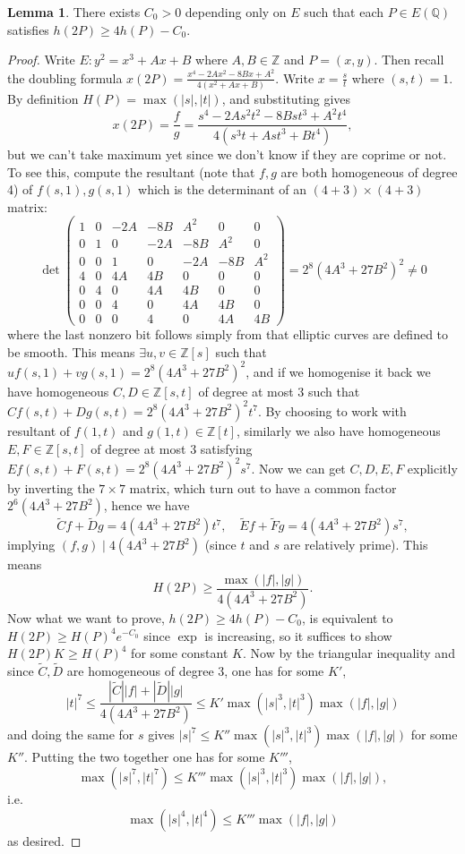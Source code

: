 \documentclass{article}
\newcommand{\Z}{\mathbb{Z}}
\newcommand{\Q}{\mathbb{Q}}
\theoremstyle{definition}
\newtheorem{lemma}[defn]{Lemma}
\begin{document}
\begin{lemma}
There exists $C_0>0$ depending only on $E$ such that each $P\in E(\Q)$ satisfies $h(2P)\geq 4h(P)-C_0$.
\end{lemma}
\begin{proof}
Write $E:y^2=x^3+Ax+B$ where $A,B\in\Z$ and $P=(x,y)$. Then recall the doubling formula $x(2P)=\frac{x^4-2Ax^2-8Bx+A^2}{4(x^2+Ax+B)}$. Write $x=\frac{s}{t}$ where $(s,t)=1$. By definition $H(P)=\max(|s|,|t|)$, and substituting gives
\[
x(2P)=\frac{f}{g}=\frac{s^4-2As^2t^2-8Bst^3+A^2t^4}{4(s^3t+Ast^3+Bt^4)},
\]
but we can't take maximum yet since we don't know if they are coprime or not. To see this, compute the resultant (note that $f,g$ are both homogeneous of degree 4) of $f(s,1),g(s,1)$ which is the determinant of an $(4+3)\times (4+3)$ matrix:
\[
\det\begin{pmatrix}
1 & 0 & -2A & -8B & A^2 & 0 & 0 \\
0 & 1 & 0 & -2A & -8B & A^2 & 0 \\
0 & 0 & 1 & 0 & -2A & -8B & A^2 \\
4 & 0 & 4A & 4B & 0 & 0 & 0 \\
0 & 4 & 0 & 4A & 4B & 0 & 0 \\
0 & 0 & 4 & 0 & 4A & 4B & 0 \\
0 & 0 & 0 & 4 & 0 & 4A & 4B
\end{pmatrix}=2^8(4A^3+27B^2)^2\neq 0
\]
where the last nonzero bit follows simply from that elliptic curves are defined to be smooth. This means $\exists u,v\in\Z[s]$ such that $uf(s,1)+vg(s,1)=2^8(4A^3+27B^2)^2$, and if we homogenise it back we have homogeneous $C,D\in\Z[s,t]$ of degree at most 3 such that $Cf(s,t)+Dg(s,t)=2^8(4A^3+27B^2)^2t^7$. By choosing to work with resultant of $f(1,t)$ and $g(1,t)\in\Z[t]$, similarly we also have homogeneous $E,F\in\Z[s,t]$ of degree at most 3 satisfying $Ef(s,t)+F(s,t)=2^8(4A^3+27B^2)^2s^7$. Now we can get $C,D,E,F$ explicitly by inverting the $7\times 7$ matrix, which turn out to have a common factor $2^6(4A^3+27B^2)$, hence we have
\[
\widetilde Cf+\widetilde Dg=4(4A^3+27B^2)t^7,\quad \widetilde Ef+\widetilde Fg=4(4A^3+27B^2)s^7,
\]
implying $(f,g)\mid 4(4A^3+27B^2)$ (since $t$ and $s$ are relatively prime). This means
\[
H(2P)\geq\frac{\max(|f|,|g|)}{4(4A^3+27B^2)}.
\]
Now what we want to prove, $h(2P)\geq 4h(P)-C_0$, is equivalent to $H(2P)\geq H(P)^4e^{-C_0}$ since $\exp$ is increasing, so it suffices to show $H(2P)K\geq H(P)^4$ for some constant $K$. Now by the triangular inequality and since $\widetilde C,\widetilde D$ are homogeneous of degree 3, one has for some $K'$,
\[
|t|^7\leq\frac{|\widetilde C||f|+|\widetilde D||g|}{4(4A^3+27B^2)}\leq K'\max\left(|s|^3,|t|^3\right)\max(|f|,|g|)
\]
and doing the same for $s$ gives $|s|^7\leq K''\max\left(|s|^3,|t|^3\right)\max(|f|,|g|)$ for some $K''$. Putting the two together one has for some $K'''$,
\[
\max\left(|s|^7,|t|^7\right)\leq K'''\max\left(|s|^3,|t|^3\right)\max(|f|,|g|),
\]
i.e.
\[
\max\left(|s|^4,|t|^4\right)\leq K'''\max(|f|,|g|)
\]
as desired.
\end{proof}
\end{document}

